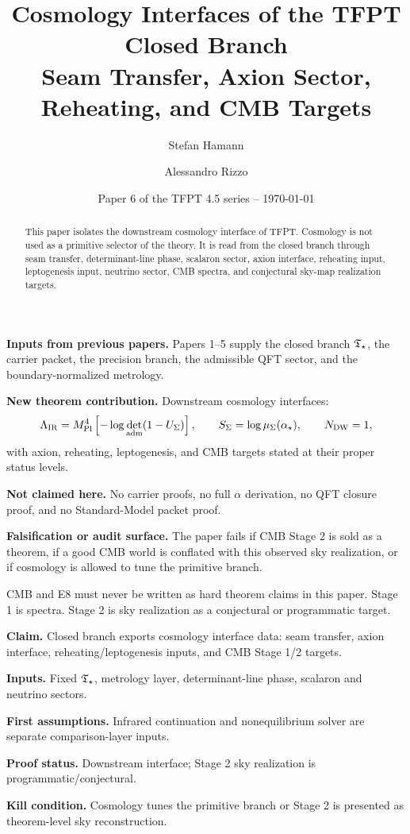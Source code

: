\documentclass[11pt,a4paper]{article}
\title{\color{tfptblue}\textbf{Cosmology Interfaces of the TFPT Closed Branch}\\[0.35em]
{\Large Seam Transfer, Axion Sector, Reheating, and CMB Targets}}
\author{Stefan Hamann \and Alessandro Rizzo}
\date{{\normalsize\color{tfptgray}\sffamily Paper 6 of the TFPT 4.5 series -- \today}}
\begin{document}
\maketitle

\begin{abstract}
This paper isolates the downstream cosmology interface of TFPT. Cosmology is not used as a
primitive selector of the theory. It is read from the closed branch through seam transfer,
determinant-line phase, scalaron sector, axion interface, reheating input, leptogenesis input,
neutrino sector, CMB spectra, and conjectural sky-map realization targets.
\end{abstract}

\begin{tfptfrontbox}
\textbf{Inputs from previous papers.} Papers 1--5 supply the closed branch $\mathfrak T_{\star}$, the carrier
packet, the precision branch, the admissible QFT sector, and the boundary-normalized metrology.

\textbf{New theorem contribution.} Downstream cosmology interfaces:
\[
\Lambda_{\mathrm{IR}}
=
M_{\mathrm{Pl}}^4\left[-\log\det_{\mathrm{adm}}(1-U_\Sigma)\right],
\qquad
S_\Sigma=\log\mu_\Sigma(\alpha_\star),
\qquad
N_{\mathrm{DW}}=1,
\]
with axion, reheating, leptogenesis, and CMB targets stated at their proper status levels.

\textbf{Not claimed here.} No carrier proofs, no full $\alpha$ derivation, no QFT closure proof,
and no Standard-Model packet proof.

\textbf{Falsification or audit surface.} The paper fails if CMB Stage 2 is sold as a theorem, if a
good CMB world is conflated with this observed sky realization, or if cosmology is allowed to tune
the primitive branch.
\end{tfptfrontbox}

\begin{tfptwarningbox}
CMB and E8 must never be written as hard theorem claims in this paper. Stage 1 is spectra. Stage 2
is sky realization as a conjectural or programmatic target.
\end{tfptwarningbox}


\begin{tfptclaimcontract}
\textbf{Claim.} Closed branch exports cosmology interface data: seam transfer, axion interface, reheating/leptogenesis inputs, and CMB Stage 1/2 targets.\par
\textbf{Inputs.} Fixed $\mathfrak T_{\star}$, metrology layer, determinant-line phase, scalaron and neutrino sectors.\par
\textbf{First assumptions.} Infrared continuation and nonequilibrium solver are separate comparison-layer inputs.\par
\textbf{Proof status.} Downstream interface; Stage 2 sky realization is programmatic/conjectural.\par
\textbf{Kill condition.} Cosmology tunes the primitive branch or Stage 2 is presented as theorem-level sky reconstruction.\par
\end{tfptclaimcontract}
\end{document}
